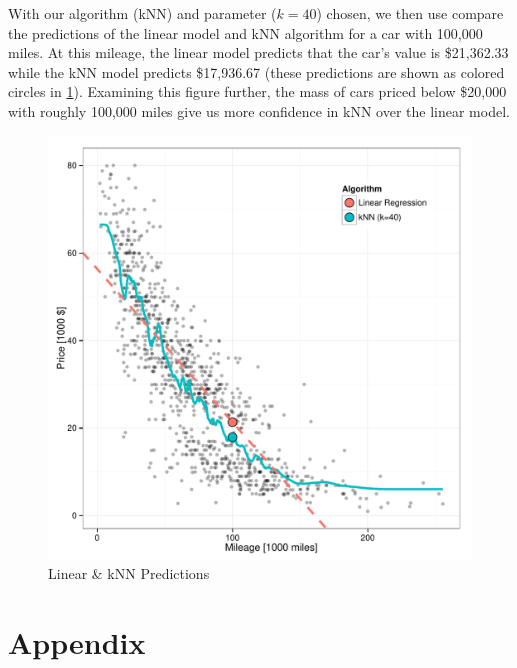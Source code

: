 \documentclass[11pt, fleqn]{article}
\begin{document}


With our algorithm (kNN) and parameter ($k=40$) chosen, we then use compare the predictions of the linear model and kNN algorithm for a car with 100,000 miles.  At this mileage, the linear model predicts that the car's value is \$21,362.33 while the kNN model predicts \$17,936.67 (these predictions are shown as colored circles in \cref{fig:predict}).  Examining this figure further, the mass of cars priced below \$20,000 with roughly 100,000 miles give us more confidence in kNN over the linear model.


\begin{figure}[!htb]
  \centering
  \includegraphics[scale=.5]{predict.pdf}
  \caption{Linear \& kNN Predictions}
  \label{fig:predict}
\end{figure}

\clearpage
\section{Appendix}
\end{document}
